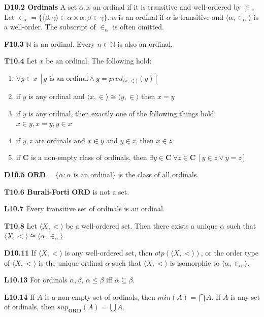 \documentclass[10pt, landscape]{article}
\begin{document}
\begin{multicols*}{3}
\textbf{D10.2 Ordinals} A set $\alpha$ is an ordinal if it is transitive and well-ordered by $\in$. Let $\in_{\alpha}=\{\langle \beta, \gamma \rangle \in \alpha \times \alpha : \beta \in \gamma\}$. $\alpha$ is an ordinal if $\alpha$ is transitive and $\langle \alpha, \in_{\alpha}\rangle$ is a well-order. The subscript of $\in_\alpha$ is often omitted.

\textbf{F10.3} $\mathbb{N}$ is an ordinal. Every $n \in \mathbb{N}$ is also an ordinal.

\textbf{T10.4} Let $x$ be an ordinal. The following hold:
\begin{enumerate}
    \item $\forall y \in x\ [y \text{ is an ordinal} \land y=pred_{\langle x, \in \rangle}(y)]$
    \item if $y$ is any ordinal and $\langle x,\in\rangle \cong \langle y, \in \rangle$ then $x=y$
    \item if $y$ is any ordinal, then exactly one of the following things hold: $x \in y, x=y, y \in x$
    \item if $y, z$ are ordinals and $x\in y$ and $y \in z$, then $x \in z$
    \item if $\mathbf{C}$ is a non-empty class of ordinals, then $\exists y \in \mathbf{C}\ \forall z \in \mathbf{C}\ [y \in z \lor y =z]$
\end{enumerate}

\textbf{D10.5} $\mathbf{ORD}=\{\alpha:\alpha \text{ is an ordinal}\}$ is the class of all ordinals.

\textbf{T10.6 Burali-Forti} $\mathbf{ORD}$ is not a set.

\textbf{L10.7} Every transitive set of ordinals is an ordinal.

\textbf{T10.8} Let $\langle X, < \rangle$ be a well-ordered set. Then there exists a unique $\alpha$ such that $\langle X,<\rangle\cong\langle\alpha, \in_\alpha\rangle$.

\textbf{D10.11} If $\langle X, <\rangle$ is any well-ordered set, then $otp(\langle X, < \rangle)$, or the order type of $\langle X, < \rangle$ is the unique ordinal $\alpha$ such that $\langle X, <\rangle$ is isomorphic to $\langle \alpha, \in_\alpha\rangle$.

\textbf{L10.13} For ordinals $\alpha, \beta$, $\alpha \leq \beta$ iff $\alpha \subseteq \beta$.

\textbf{L10.14} If $A$ is a non-empty set of ordinals, then $min(A)=\bigcap A$. If $A$ is any set of ordinals, then $sup_{\mathbf{ORD}}(A)=\bigcup A$.


\end{multicols*}
\end{document}
